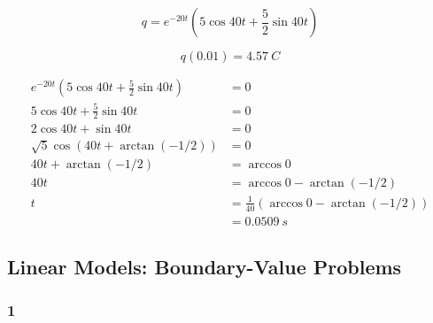 \documentclass{article}
\begin{document}
\[q = e^{-20 t} (5 \cos 40 t + \frac{5}{2} \sin 40 t)\]

\[q(0.01) = \qty{4.57}{C}\]

\begin{align*}
  e^{-20 t} (5 \cos 40 t + \frac{5}{2} \sin 40 t) & = 0                                           \\
  5 \cos 40 t + \frac{5}{2} \sin 40 t             & = 0                                           \\
  2 \cos 40 t + \sin 40 t                         & = 0                                           \\
  \sqrt{5} \cos (40 t + \arctan (-1 / 2))         & = 0                                           \\
  40 t + \arctan (-1 / 2)                         & = \arccos 0                                   \\
  40 t                                            & = \arccos 0 - \arctan (-1 / 2)                \\
  t                                               & = \frac{1}{40} (\arccos 0 - \arctan (-1 / 2)) \\
                                                  & = \qty{0.0509}{s}
\end{align*}

\subsection{Linear Models: Boundary-Value Problems}

\subsubsection{1}
\end{document}
